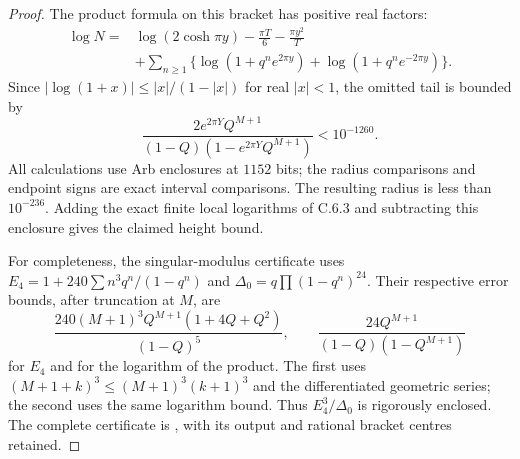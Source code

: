 \begin{proof}
The product formula on this bracket has positive real factors:
\begin{align*}
 \log N={}&\log(2\cosh\pi y)-\frac{\pi T}{6}
                      -\frac{\pi y^2}{T}\\
 &+\sum_{n\ge1}\{\log(1+q^ne^{2\pi y})
                         +\log(1+q^ne^{-2\pi y})\}.
\end{align*}
Since $|\log(1+x)|\le |x|/(1-|x|)$ for real $|x|<1$,
the omitted tail is bounded by
\[
 \frac{2e^{2\pi Y}Q^{M+1}}
 {(1-Q)(1-e^{2\pi Y}Q^{M+1})}<10^{-1260}.
\]
All calculations use Arb enclosures at $1152$ bits; the
radius comparisons and endpoint signs are exact interval
comparisons. The resulting radius is less than $10^{-236}$.
Adding the exact finite local logarithms of C.6.3 and
subtracting this enclosure gives the claimed height bound.

For completeness, the singular-modulus certificate uses
$E_4=1+240\sum n^3q^n/(1-q^n)$ and
$\Delta_0=q\prod(1-q^n)^{24}$. Their respective error
bounds, after truncation at $M$, are
\[
 \frac{240(M+1)^3Q^{M+1}(1+4Q+Q^2)}{(1-Q)^5},
 \qquad
 \frac{24Q^{M+1}}{(1-Q)(1-Q^{M+1})}
\]
for $E_4$ and for the logarithm of the product. The first
uses $(M+1+k)^3\le(M+1)^3(k+1)^3$ and the differentiated
geometric series; the second uses the same logarithm bound.
Thus $E_4^3/\Delta_0$ is rigorously enclosed. The complete
certificate is , with its
output and rational bracket centres retained.
\end{proof}
